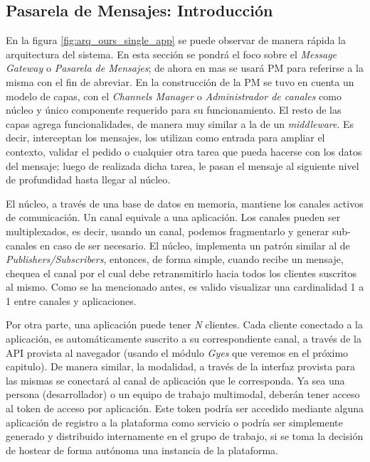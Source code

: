 \subsection{Pasarela de Mensajes: Introducción} \label{sec:arq_ours_intro}
En la figura \ref{fig:arq_ours_single_app} se puede observar de manera rápida la arquitectura del sistema. En esta sección se pondrá el foco sobre el \emph{Message Gateway} o \emph{Pasarela de Mensajes}; de ahora en mas se usará PM para referirse a la misma con el fin de abreviar.
En la construcción de la PM se tuvo en cuenta un modelo de capas, con el \emph{Channels Manager} o \emph{Administrador de canales} como núcleo y único componente requerido para su funcionamiento. El resto de las capas agrega funcionalidades, de manera muy similar a la de un \emph{middleware}. Es decir, interceptan los mensajes, los utilizan como entrada para ampliar el contexto, validar el pedido o cualquier otra tarea que pueda hacerse con los datos del mensaje; luego de realizada dicha tarea, le pasan el mensaje al siguiente nivel de profundidad hasta llegar al núcleo.

El núcleo, a través de una base de datos en memoria, mantiene los canales activos de comunicación. Un canal equivale a una aplicación. Los canales pueden ser multiplexados, es decir, usando un canal, podemos fragmentarlo y generar sub-canales en caso de ser necesario. 
El núcleo, implementa un patrón similar al de \emph{Publishers/Subscribers}, entonces, de forma simple, cuando recibe un mensaje, chequea el canal por el cual debe retransmitirlo hacia todos los clientes suscritos al mismo. Como se ha mencionado antes, es valido visualizar una cardinalidad 1 a 1 entre canales y aplicaciones. 

Por otra parte, una aplicación puede tener \emph{N} clientes. Cada cliente conectado a la aplicación, es automáticamente suscrito a su correspondiente canal, a través de la API provista al navegador (usando el módulo \emph{Gyes} que veremos en el próximo capitulo). De manera similar, la modalidad, a través de la interfaz provista para las mismas se conectará al canal de aplicación que le corresponda. Ya sea una persona (desarrollador) o un equipo de trabajo multimodal, deberán tener acceso al token de acceso por aplicación. Este token podría ser accedido mediante alguna aplicación de registro a la plataforma como servicio o podría ser simplemente generado y distribuido internamente en el grupo de trabajo, si se toma la decisión de hostear de forma autónoma una instancia de la plataforma. 

